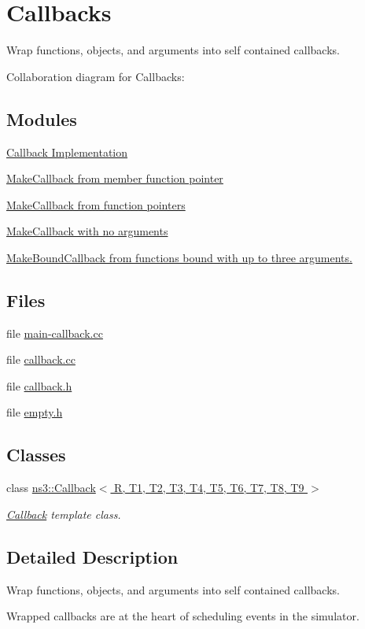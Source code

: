 \hypertarget{group__callback}{}\section{Callbacks}
\label{group__callback}


Wrap functions, objects, and arguments into self contained callbacks.  


Collaboration diagram for Callbacks\+:
\subsection*{Modules}
\begin{DoxyCompactItemize}
\item 
\hyperlink{group__callbackimpl}{Callback Implementation}
\item 
\hyperlink{group__makecallbackmemptr}{Make\+Callback from member function pointer}
\item 
\hyperlink{group__makecallbackfnptr}{Make\+Callback from function pointers}
\item 
\hyperlink{group__makenullcallback}{Make\+Callback with no arguments}
\item 
\hyperlink{group__makeboundcallback}{Make\+Bound\+Callback from functions bound with up to three arguments.}
\end{DoxyCompactItemize}
\subsection*{Files}
\begin{DoxyCompactItemize}
\item 
file \hyperlink{main-callback_8cc}{main-\/callback.\+cc}
\item 
file \hyperlink{callback_8cc}{callback.\+cc}
\item 
file \hyperlink{callback_8h}{callback.\+h}
\item 
file \hyperlink{empty_8h}{empty.\+h}
\end{DoxyCompactItemize}
\subsection*{Classes}
\begin{DoxyCompactItemize}
\item 
class \hyperlink{classns3_1_1Callback}{ns3\+::\+Callback$<$ R, T1, T2, T3, T4, T5, T6, T7, T8, T9 $>$}
\begin{DoxyCompactList}\small\item\em \hyperlink{classns3_1_1Callback}{Callback} template class. \end{DoxyCompactList}\end{DoxyCompactItemize}


\subsection{Detailed Description}
Wrap functions, objects, and arguments into self contained callbacks. 

Wrapped callbacks are at the heart of scheduling events in the simulator. 